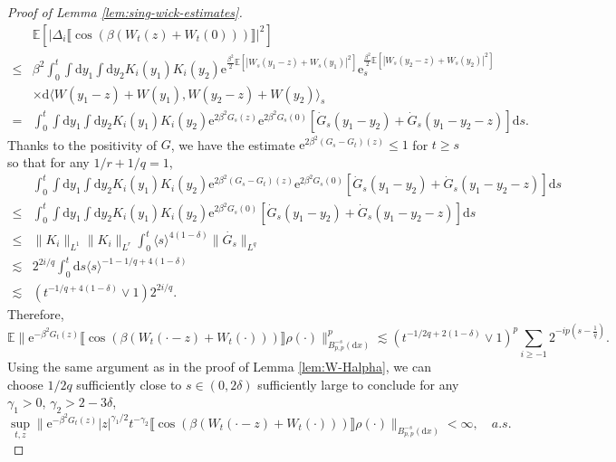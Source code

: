 \documentclass[11pt, a4paper]{scrartcl}
\numberwithin{equation}{section}
\theoremstyle{plain}
\theoremstyle{remark}
\newcommand{\mathd}{\mathrm{d}}
\newcommand{\mathe}{\mathrm{e}}
\begin{document}
\begin{proof}[Proof of Lemma \ref{lem:sing-wick-estimates}]
\[\begin{aligned}
       & \mathbb{E} [| \Delta_i \llbracket \cos (\beta (W_t (z) + W_t (0)))
       \rrbracket |^2]\\
       \leqslant & \beta^2 \int_0^t \int \mathd y_1 \int \mathd y_2 K_i (y_1)
       K_i (y_2) \mathe^{\frac{\beta^2}{2} \mathbb{E} [| W_s (y_1 - z) + W_s
       (y_1) |^2]} \mathe^{\frac{\beta^2}{2} \mathbb{E} [| W_s (y_2 - z) + W_s
       (y_2) |^2]}_s\\
       & \times \mathd \langle W (y_1 - z) + W (y_1), W (y_2 - z) + W (y_2)
       \rangle_s\\
       = & \int_0^t \int \mathd y_1 \int \mathd y_2 K_i (y_1) K_i (y_2)
       \mathe^{2 \beta^2 G_s (z)} \mathe^{2 \beta^2 G_s (0)} [\dot{G}_s (y_1 -
       y_2) + \dot{G}_s (y_1 - y_2 - z)] \mathd s.
     \end{aligned} \]
  Thanks to the positivity of $G$, we have the estimate $\mathe^{2 \beta^2
  (G_s - G_t) (z)} \leqslant 1$ for $t \geqslant s$ so that for any $1 / r + 1
  / q = 1$,
  {\footnotesize\[ \begin{aligned}
       & \int_0^t \int \mathd y_1 \int \mathd y_2 K_i (y_1) K_i (y_2)
       \mathe^{2 \beta^2 (G_s - G_t) (z)} \mathe^{2 \beta^2 G_s (0)}
       [\dot{G}_s (y_1 - y_2) + \dot{G}_s (y_1 - y_2 - z)] \mathd s\\
       \leqslant & \int_0^t \int \mathd y_1 \int \mathd y_2 K_i (y_1) K_i
       (y_2) \mathe^{2 \beta^2 G_s (0)} [\dot{G}_s (y_1 - y_2) + \dot{G}_s
       (y_1 - y_2 - z)] \mathd s\\
       \leqslant & \| K_i \|_{L^1}  \| K_i \|_{L^r} \int_0^t \langle s
       \rangle^{4 (1 - \delta)} \| \dot{G_s}  \|_{L^q}\\
       \lesssim & 2^{2 i / q}  \int_0^t \mathd s \langle s \rangle^{- 1 - 1 /
       q + 4 (1 - \delta)}\\
       \lesssim & (t^{- 1 / q + 4 (1 - \delta)} \vee 1) 2^{2 i / q} .
     \end{aligned} \]}
  Therefore,
 {\small \[ \mathbb{E} \| \mathe^{- \beta^2 G_t (z)} \llbracket \cos (\beta (W_t
     (\cdot - z) + W_t (\cdot))) \rrbracket \rho (\cdot) \|^p_{B^{- s}_{p, p}
     (\mathd x)} \lesssim (t^{- 1 / 2 q + 2 (1 - \delta)} \vee 1)^p \sum_{i
     \geqslant - 1} 2^{- ip \left( s - \frac{1}{q} \right)} . \]}Using the same argument as in the proof of Lemma \ref{lem:W-Halpha}, we can
  choose $1 / 2 q$ sufficiently close to $s \in (0, 2 \delta)$ sufficiently
  large to conclude for any $\gamma_1 > 0$, $\gamma_2 > 2 - 3 \delta$,
  \[ \sup_{t, z} \| \mathe^{- \beta^2 G_t (z)} | z |^{\gamma_1 / 2} t^{-
     \gamma_2} \llbracket \cos (\beta (W_t (\cdot - z) + W_t (\cdot)))
     \rrbracket \rho (\cdot) \|_{B^{- s}_{p, p} (\mathd x)} < \infty, \quad
     a.s. \]
\end{proof}

\end{document}
